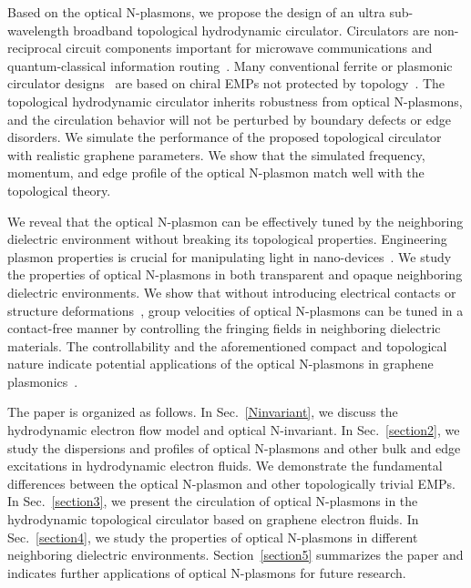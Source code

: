 \documentclass[%
reprint,
amsmath,amssymb,
aps,superscriptaddress
]{revtex4-2}
\begin{document}
Based on the optical N-plasmons, we propose the design of an ultra sub-wavelength broadband topological hydrodynamic circulator. Circulators are non-reciprocal circuit components important for microwave communications and quantum-classical information routing~\cite{stace2004mesoscopic,kerckhoff2015chip,chapman2017widely}. %
Many conventional ferrite or plasmonic circulator designs~\cite{pardavi2000microwave,dmitriev2019ultrawideband,viola2014hall,mahoney2017chip} are based on chiral EMPs not protected by topology~\cite{volkov1985theory}. The topological hydrodynamic circulator inherits robustness from optical N-plasmons, and the circulation behavior will not be perturbed by boundary defects or edge disorders. We simulate the performance of the proposed topological circulator with realistic graphene parameters. We show that the simulated frequency, momentum, and edge profile of the optical N-plasmon match well with the topological theory. 

We reveal that the optical N-plasmon can be effectively tuned by the neighboring dielectric environment without breaking its topological properties. %
Engineering plasmon properties is crucial for manipulating light in nano-devices~\cite{alonso2014controlling}. We study the properties of optical N-plasmons in both transparent and opaque neighboring dielectric environments. We show that without introducing electrical contacts or structure deformations~\cite{kamata2010voltage,jin2017infrared,jiang2018group}, group velocities of optical N-plasmons can be tuned in a contact-free manner by controlling the fringing fields in neighboring dielectric materials. The controllability and the aforementioned compact and topological nature indicate potential applications of the optical N-plasmons in graphene plasmonics~\cite{koppens2011graphene,jablan2009plasmonics,jablan2013plasmons,garcia2014graphene,chen2012optical,grigorenko2012graphene,zhao2023observation}.

The paper is organized as follows. In Sec.~\ref{Ninvariant}, we discuss the hydrodynamic electron flow model and optical N-invariant. In Sec.~\ref{section2}, we study the dispersions and profiles of optical N-plasmons and other bulk and edge excitations in hydrodynamic electron fluids. We demonstrate the fundamental differences between the optical N-plasmon and other topologically trivial EMPs. In Sec.~\ref{section3}, we present the circulation of optical N-plasmons in the hydrodynamic topological circulator based on graphene electron fluids. In Sec.~\ref{section4}, we study the properties of optical N-plasmons in different neighboring dielectric environments. Section~\ref{section5} summarizes the paper and indicates further applications of optical N-plasmons for future research.
\end{document}
